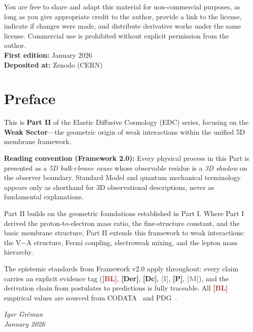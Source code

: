 \documentclass[11pt,a4paper]{book}
\theoremstyle{definition}
\theoremstyle{remark}
\newcommand{\tagBL}{\textcolor{brown}{\textbf{[BL]}}}
\newcommand{\tagDer}{\textcolor{derivedColor}{\textbf{[Der]}}}
\newcommand{\tagDc}{\textcolor{calibratedColor}{\textbf{[Dc]}}}
\newcommand{\tagI}{\textcolor{gray}{\textbf{[I]}}}
\newcommand{\tagP}{\textcolor{postulatedColor}{\textbf{[P]}}}
\newcommand{\tagM}{\textcolor{gray}{\textbf{[M]}}}
\begin{document}
\noindent You are free to share and adapt this material for non-commercial purposes,
as long as you give appropriate credit to the author, provide a link to the license,
indicate if changes were made, and distribute derivative works under the same license.
Commercial use is prohibited without explicit permission from the author.\\[1.5cm]

\noindent\textbf{First edition:} January 2026\\[0.3cm]
\noindent\textbf{Deposited at:} Zenodo (CERN)\\[0.3cm]

\vfill

\chapter*{Preface}

This is \textbf{Part II} of the Elastic Diffusive Cosmology (EDC) series, focusing on the
\textbf{Weak Sector}---the geometric origin of weak interactions within the unified 5D
membrane framework.

\textbf{Reading convention (Framework 2.0):} Every physical process in this Part is
presented as a \emph{5D bulk+brane cause} whose observable residue is a \emph{3D shadow}
on the observer boundary. Standard Model and quantum mechanical terminology appears only
as shorthand for 3D observational descriptions, never as fundamental explanations.

Part II builds on the geometric foundations established in Part I. Where Part I derived
the proton-to-electron mass ratio, the fine-structure constant, and the basic membrane
structure, Part II extends this framework to weak interactions: the V$-$A structure,
Fermi coupling, electroweak mixing, and the lepton mass hierarchy.

The epistemic standards from Framework v2.0 apply throughout: every claim carries an
explicit evidence tag (\tagBL{}, \tagDer{}, \tagDc{}, \tagI{}, \tagP{}, \tagM{}), and
the derivation chain from postulates to predictions is fully traceable. All \tagBL{}
empirical values are sourced from CODATA~\cite{CODATA2022} and PDG~\cite{PDG2024}.

\vspace{1cm}
\hfill\textit{Igor Gr\v{c}man}\\
\hfill\textit{January 2026}
\end{document}
